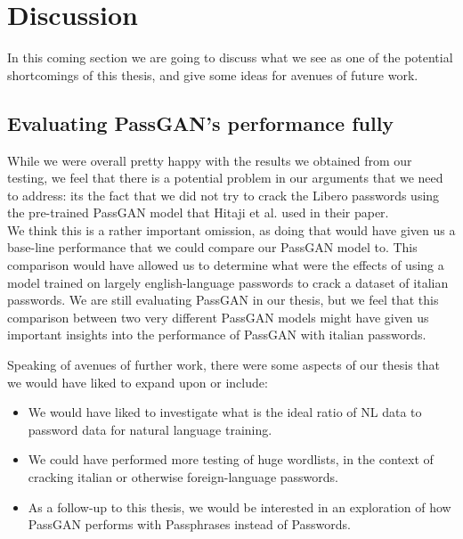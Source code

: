 \section{Discussion}\label{sec:discussion}

In this coming section we are going to discuss what we see as one of the potential shortcomings of this thesis, and give some ideas for avenues of future work.

\subsection{Evaluating PassGAN's performance fully}
While we were overall pretty happy with the results we obtained from our testing, we feel that there is a potential problem in our arguments that we need to address: its the fact that we did not try to crack the Libero passwords using the pre-trained PassGAN model that Hitaji et al. \cite{PassGAN} used in their paper. \\ 
We think this is a rather important omission, as doing that would have given us a base-line performance that we could compare our PassGAN model to.  This comparison would have allowed us to determine what were the effects of using a model trained on largely english-language passwords to crack a dataset of italian passwords. We are still evaluating PassGAN in our thesis, but we feel that this comparison between two very different PassGAN models might have given us important insights into the performance of PassGAN with italian passwords.


Speaking of avenues of further work, there were some aspects of our thesis that we would have liked to expand upon or include: 
\begin{itemize}
\item We would have liked to investigate what is the ideal ratio of NL data to password data for natural language training.
\item We could have performed more testing of huge wordlists, in the context of cracking italian or otherwise foreign-language passwords.
\item As a follow-up to this thesis, we would be interested in an exploration of how PassGAN performs with Passphrases instead of Passwords.
\end{itemize}

